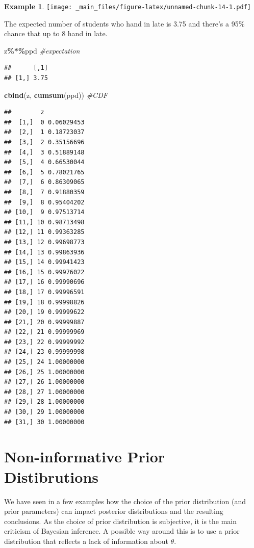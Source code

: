 \documentclass[
]{book}
\newenvironment{Shaded}{\begin{snugshade}}{\end{snugshade}}
\newcommand{\CommentTok}[1]{\textcolor[rgb]{0.56,0.35,0.01}{\textit{#1}}}
\newcommand{\FunctionTok}[1]{\textcolor[rgb]{0.13,0.29,0.53}{\textbf{#1}}}
\newcommand{\NormalTok}[1]{#1}
\newcommand{\SpecialCharTok}[1]{\textcolor[rgb]{0.81,0.36,0.00}{\textbf{#1}}}
\theoremstyle{definition}
\theoremstyle{definition}
\newtheorem{example}{Example}[chapter]
\theoremstyle{definition}
\theoremstyle{definition}
\theoremstyle{remark}
\begin{document}
\begin{example}
\texttt{[image: \_main\_files/figure-latex/unnamed-chunk-14-1.pdf]}

The expected number of students who hand in late is 3.75 and there's a 95\% chance that up to 8 hand in late.

\begin{Shaded}
\begin{Highlighting}[]
\NormalTok{z}\SpecialCharTok{\%*\%}\NormalTok{ppd }\CommentTok{\#expectation}
\end{Highlighting}
\end{Shaded}

\begin{verbatim}
##      [,1]
## [1,] 3.75
\end{verbatim}

\begin{Shaded}
\begin{Highlighting}[]
\FunctionTok{cbind}\NormalTok{(z, }\FunctionTok{cumsum}\NormalTok{(ppd)) }\CommentTok{\#CDF}
\end{Highlighting}
\end{Shaded}

\begin{verbatim}
##        z           
##  [1,]  0 0.06029453
##  [2,]  1 0.18723037
##  [3,]  2 0.35156696
##  [4,]  3 0.51889148
##  [5,]  4 0.66530044
##  [6,]  5 0.78021765
##  [7,]  6 0.86309065
##  [8,]  7 0.91880359
##  [9,]  8 0.95404202
## [10,]  9 0.97513714
## [11,] 10 0.98713498
## [12,] 11 0.99363285
## [13,] 12 0.99698773
## [14,] 13 0.99863936
## [15,] 14 0.99941423
## [16,] 15 0.99976022
## [17,] 16 0.99990696
## [18,] 17 0.99996591
## [19,] 18 0.99998826
## [20,] 19 0.99999622
## [21,] 20 0.99999887
## [22,] 21 0.99999969
## [23,] 22 0.99999992
## [24,] 23 0.99999998
## [25,] 24 1.00000000
## [26,] 25 1.00000000
## [27,] 26 1.00000000
## [28,] 27 1.00000000
## [29,] 28 1.00000000
## [30,] 29 1.00000000
## [31,] 30 1.00000000
\end{verbatim}

\end{example}

\hypertarget{non-informative-prior-distibrutions}{%
\section{Non-informative Prior Distibrutions}\label{non-informative-prior-distibrutions}}

We have seen in a few examples how the choice of the prior distribution (and prior parameters) can impact posterior distributions and the resulting conclusions. As the choice of prior distribution is subjective, it is the main criticism of Bayesian inference. A possible way around this is to use a prior distribution that reflects a lack of information about \(\theta\).
\end{document}
